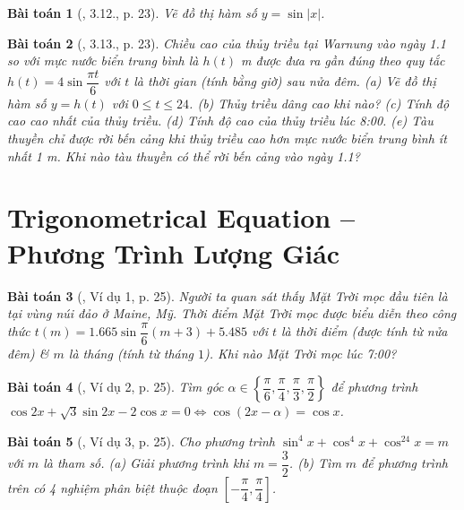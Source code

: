 \documentclass{article}
\newtheorem{baitoan}{Bài toán}
\begin{document}
\begin{baitoan}[\cite{Hung_nang_cao_phat_trien_Toan_11_tap_1}, 3.12., p. 23]
	Vẽ đồ thị hàm số $y = \sin|x|$.
\end{baitoan}

\begin{baitoan}[\cite{Hung_nang_cao_phat_trien_Toan_11_tap_1}, 3.13., p. 23]
	Chiều cao của thủy triều tại Warnung vào ngày {\rm1.1} so với mực nước biển trung bình là $h(t)$ {\rm m} được đưa ra gần đúng theo quy tắc $h(t) = 4\sin\dfrac{\pi t}{6}$ với $t$ là thời gian (tính bằng giờ) sau nửa đêm. (a) Vẽ đồ thị hàm số $y = h(t)$ với $0\le t\le24$. (b) Thủy triều dâng cao khi nào? (c) Tính độ cao cao nhất của thủy triều. (d) Tính độ cao của thủy triều lúc {\rm8:00}. (e) Tàu thuyền chỉ được rời bến cảng khi thủy triều cao hơn mực nước biển trung bình ít nhất {\rm1 m}. Khi nào tàu thuyền có thể rời bến cảng vào ngày {\rm1.1}?
\end{baitoan}


\section{Trigonometrical Equation -- Phương Trình Lượng Giác}

\begin{baitoan}[\cite{Hung_nang_cao_phat_trien_Toan_11_tap_1}, Ví dụ 1, p. 25]
	Người ta quan sát thấy Mặt Trời mọc đầu tiên là tại vùng núi đảo ở Maine, Mỹ. Thời điểm Mặt Trời mọc được biểu diễn theo công thức $t(m) = 1.665\sin\dfrac{\pi}{6}(m + 3) + 5.485$ với $t$ là thời điểm (được tính từ nửa đêm) \& $m$ là tháng (tính từ tháng $1$). Khi nào Mặt Trời mọc lúc {\rm7:00}?
\end{baitoan}

\begin{baitoan}[\cite{Hung_nang_cao_phat_trien_Toan_11_tap_1}, Ví dụ 2, p. 25]
	Tìm góc $\alpha\in\left\{\dfrac{\pi}{6},\dfrac{\pi}{4},\dfrac{\pi}{3},\dfrac{\pi}{2}\right\}$ để phương trình $\cos2x + \sqrt{3}\sin2x - 2\cos x = 0\Leftrightarrow\cos(2x - \alpha) = \cos x$.
\end{baitoan}

\begin{baitoan}[\cite{Hung_nang_cao_phat_trien_Toan_11_tap_1}, Ví dụ 3, p. 25]
	Cho phương trình $\sin^4x + \cos^4x + \cos^24x = m$ với $m$ là tham số. (a) Giải phương trình khi $m = \dfrac{3}{2}$. (b) Tìm $m$ để phương trình trên có 4 nghiệm phân biệt thuộc đoạn $\left[-\dfrac{\pi}{4},\dfrac{\pi}{4}\right]$.
\end{baitoan}
\end{document}
